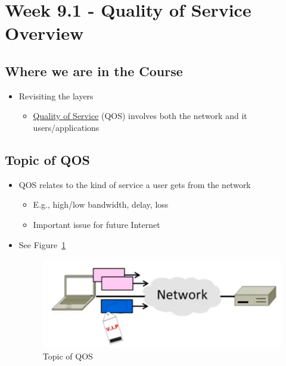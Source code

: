\documentclass[12pt]{ctexart}   %
\begin{document}
\section{Week 9.1 - Quality of Service Overview}	
	\subsection{Where we are in the Course}
	\begin{itemize}
		\item Revisiting the layers
		\begin{itemize}
			\item \underline{Quality of Service} (QOS) involves both the network and it users/applications
		\end{itemize}
	\end{itemize}
	
	\subsection{Topic of QOS}
	\begin{itemize}
		\item QOS relates to the kind of service a user gets from the network
		\begin{itemize}
			\item E.g., high/low bandwidth, delay, loss
			\item Important issue for future Internet
		\end{itemize}
		\item See Figure~\ref{fig:9-1-1}
		  
		 \begin{figure}[h!] %
		\centering
		 \includegraphics[scale=0.7]{images/9-1-1}
		\caption{ Topic of QOS }
		 \label{fig:9-1-1}
		 \end{figure}
	\end{itemize}
	
\end{document}
